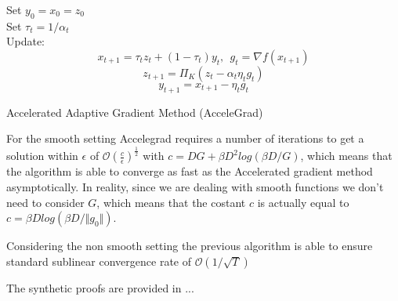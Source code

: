 \documentclass[12pt]{article}
\theoremstyle{definition}
\begin{document}
\begin{algorithm}

    Set $y_0 = x_0 = z_0$ \\
      {
      	Set $\tau_t = 1/\alpha_t$ \\
      	Update:
			$$ x_{t+1} = \tau_t z_t + (1-\tau_t) y_t, \ \ g_t = \nabla f(x_{t+1}) $$
			$$ z_{t+1} = \Pi_K (z_t - \alpha_t \eta_t g_t) $$
			$$ y_{t+1} = x_{t+1} - \eta_t g_t $$
      }
    \caption{Accelerated Adaptive Gradient Method (AcceleGrad)}
    \label{alg:accelegrad-algo}
\end{algorithm}

\newpage

For the smooth setting Accelegrad requires a number of iterations to get a solution within $\epsilon$ of $\mathcal{O}(\frac{c}{\epsilon})^{\frac{1}{2}}$ with $c = DG + \beta D^2log(\beta D/G)$, which means that the algorithm is able to converge as fast as the Accelerated gradient method asymptotically. In reality, since we are dealing with smooth functions we don't need to consider $G$, which means that the costant $c$ is actually equal to $c = \beta D  log(\beta D /\Vert g_0 \Vert)$.

Considering the non smooth setting the previous algorithm is able to ensure standard sublinear convergence rate of $\mathcal{O}(1/\sqrt T)$



The synthetic proofs are provided in ...


%
%
\end{document}
